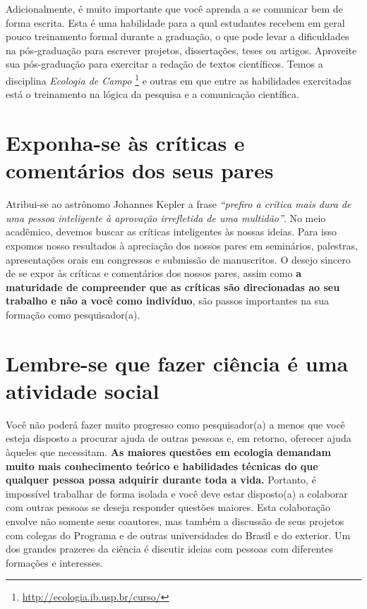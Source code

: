Adicionalmente, é muito importante que você aprenda a se comunicar bem
de forma escrita. Esta é uma habilidade para a qual estudantes recebem
em geral pouco treinamento formal durante a graduação, o que pode
levar a dificuldades na pós-graduação para escrever projetos,
dissertações, teses ou artigos. Aproveite sua pós-graduação para
exercitar a redação de textos científicos. Temos a disciplina
\emph{Ecologia de Campo}
\footnote{\url{http://ecologia.ib.usp.br/curso/}} e outras em que
entre as habilidades exercitadas está o treinamento na lógica da
pesquisa e a comunicação científica.

\section{Exponha-se às críticas e comentários dos seus pares}


Atribui-se ao astrônomo Johannes Kepler a frase \emph{``prefiro a
  crítica mais dura de uma pessoa inteligente à aprovação irrefletida
  de uma multidão''}.  No meio acadêmico, devemos buscar as críticas
inteligentes às nossas ideias. Para isso expomos nosso resultados à
apreciação dos nossos pares em seminários, palestras, apresentações
orais em congressos e submissão de manuscritos. O desejo sincero de se
expor às críticas e comentários dos nossos pares, assim como \textbf{a
  maturidade de compreender que as críticas são direcionadas ao seu
  trabalho e não a você como indivíduo}, são passos importantes na sua
formação como pesquisador(a).

\section{Lembre-se que fazer ciência é uma atividade social}

Você não poderá fazer muito progresso como pesquisador(a) a menos que
você esteja disposto a procurar ajuda de outras pessoas e, em retorno,
oferecer ajuda àqueles que necessitam. \textbf{As maiores questões em
  ecologia demandam muito mais conhecimento teórico e habilidades
  técnicas do que qualquer pessoa possa adquirir durante toda a vida.}
Portanto, é impossível trabalhar de forma isolada e você deve estar
disposto(a) a colaborar com outras pessoas se deseja responder questões
maiores. Esta colaboração envolve não somente seus coautores, mas
também a discussão de seus projetos com colegas do Programa e de
outras universidades do Brasil e do exterior. Um dos grandes prazeres
da ciência é discutir ideias com pessoas com diferentes formações e
interesses.


